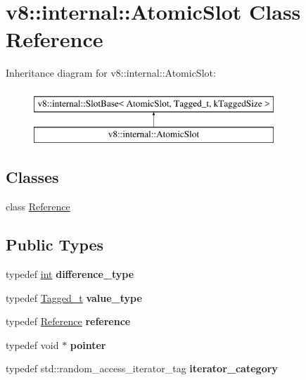 \hypertarget{classv8_1_1internal_1_1AtomicSlot}{}\section{v8\+:\+:internal\+:\+:Atomic\+Slot Class Reference}
\label{classv8_1_1internal_1_1AtomicSlot}
Inheritance diagram for v8\+:\+:internal\+:\+:Atomic\+Slot\+:\begin{figure}[H]
\begin{center}
\leavevmode
\includegraphics[height=2.000000cm]{classv8_1_1internal_1_1AtomicSlot}
\end{center}
\end{figure}
\subsection*{Classes}
\begin{DoxyCompactItemize}
\item 
class \mbox{\hyperlink{classv8_1_1internal_1_1AtomicSlot_1_1Reference}{Reference}}
\end{DoxyCompactItemize}
\subsection*{Public Types}
\begin{DoxyCompactItemize}
\item 
\mbox{\label{classv8_1_1internal_1_1AtomicSlot_a06691537e2d58b02290bde7c7e92d520}} 
typedef \mbox{\hyperlink{classint}{int}} {\bfseries difference\+\_\+type}
\item 
\mbox{\label{classv8_1_1internal_1_1AtomicSlot_add1e8f072b990c212b86e6e172a1d290}} 
typedef \mbox{\hyperlink{classuintptr__t}{Tagged\+\_\+t}} {\bfseries value\+\_\+type}
\item 
\mbox{\label{classv8_1_1internal_1_1AtomicSlot_ac03f1963c0104f2444712319fff91c8a}} 
typedef \mbox{\hyperlink{classv8_1_1internal_1_1AtomicSlot_1_1Reference}{Reference}} {\bfseries reference}
\item 
\mbox{\label{classv8_1_1internal_1_1AtomicSlot_a110b01e03686a5225d5cf799ba938612}} 
typedef void $\ast$ {\bfseries pointer}
\item 
\mbox{\label{classv8_1_1internal_1_1AtomicSlot_ad5f832afe0cbe712573b03d5e81bd518}} 
typedef std\+::random\+\_\+access\+\_\+iterator\+\_\+tag {\bfseries iterator\+\_\+category}
\end{DoxyCompactItemize}

